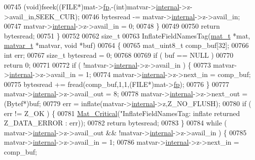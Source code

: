 \begin{DoxyCode}
{{{{{{{{{{{{{{{{{{{{{{{{00745         (void)fseek((FILE*)mat->\hyperlink{struct__mat__t_a85f562e407ca9ad4d2a6e14f839432b7}{fp},-(int)matvar->\hyperlink{group___m_a_t_a6e97e3ed9f40c49322c18561c2a94e92}{internal}->z->avail\_in,SEEK\_CUR);
00746         bytesread -= matvar->\hyperlink{group___m_a_t_a6e97e3ed9f40c49322c18561c2a94e92}{internal}->z->avail\_in;
00747         matvar->\hyperlink{group___m_a_t_a6e97e3ed9f40c49322c18561c2a94e92}{internal}->z->avail\_in = 0;
00748     \}
00749 
00750     \textcolor{keywordflow}{return} bytesread;
00751 \}
00752 
00762 \textcolor{keywordtype}{size\_t}
00763 InflateFieldNamesTag(\hyperlink{struct__mat__t}{mat\_t} *mat, \hyperlink{group___m_a_t_structmatvar__t}{matvar\_t} *matvar, \textcolor{keywordtype}{void} *buf)
00764 \{
00765     mat\_uint8\_t comp\_buf[32];
00766     \textcolor{keywordtype}{int}    err;
00767     \textcolor{keywordtype}{size\_t} bytesread = 0;
00768 
00769     \textcolor{keywordflow}{if} ( buf == NULL )
00770         \textcolor{keywordflow}{return} 0;
00771 
00772     \textcolor{keywordflow}{if} ( !matvar->\hyperlink{group___m_a_t_a6e97e3ed9f40c49322c18561c2a94e92}{internal}->z->avail\_in ) \{
00773         matvar->\hyperlink{group___m_a_t_a6e97e3ed9f40c49322c18561c2a94e92}{internal}->z->avail\_in = 1;
00774         matvar->\hyperlink{group___m_a_t_a6e97e3ed9f40c49322c18561c2a94e92}{internal}->z->next\_in = comp\_buf;
00775         bytesread += fread(comp\_buf,1,1,(FILE*)mat->\hyperlink{struct__mat__t_a85f562e407ca9ad4d2a6e14f839432b7}{fp});
00776     \}
00777     matvar->\hyperlink{group___m_a_t_a6e97e3ed9f40c49322c18561c2a94e92}{internal}->z->avail\_out = 8;
00778     matvar->\hyperlink{group___m_a_t_a6e97e3ed9f40c49322c18561c2a94e92}{internal}->z->next\_out = (Bytef*)buf;
00779     err = inflate(matvar->\hyperlink{group___m_a_t_a6e97e3ed9f40c49322c18561c2a94e92}{internal}->z,Z\_NO\_FLUSH);
00780     \textcolor{keywordflow}{if} ( err != Z\_OK ) \{
00781         \hyperlink{group__mat__util_gaf51f2bfbb5580f575e4dd79757e2b80c}{Mat\_Critical}(\textcolor{stringliteral}{"InflateFieldNamesTag: inflate returned %
      Z\_DATA\_ERROR : err));
00782         \textcolor{keywordflow}{return} bytesread;
00783     \}
00784     \textcolor{keywordflow}{while} ( matvar->\hyperlink{group___m_a_t_a6e97e3ed9f40c49322c18561c2a94e92}{internal}->z->avail\_out && !matvar->\hyperlink{group___m_a_t_a6e97e3ed9f40c49322c18561c2a94e92}{internal}->z->avail\_in ) \{
00785         matvar->\hyperlink{group___m_a_t_a6e97e3ed9f40c49322c18561c2a94e92}{internal}->z->avail\_in = 1;
00786         matvar->\hyperlink{group___m_a_t_a6e97e3ed9f40c49322c18561c2a94e92}{internal}->z->next\_in = comp\_buf;
}}}}}}}}}}}}}}}}}}}}}}}}}
\end{DoxyCode}
